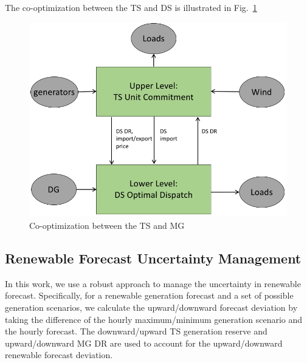 The co-optimization between the TS and DS is illustrated in Fig.~\ref{wees}
\begin{figure}
\centering
\includegraphics[scale=0.3]{flows.png}
\caption{Co-optimization between the TS and MG}
\label{wees}
\end{figure}

\subsection{Renewable Forecast Uncertainty Management}
In this work, we use a robust approach to manage the uncertainty in renewable forecast. Specifically, for a renewable generation forecast and a set of possible generation scenarios, we calculate the upward/downward forecast deviation by taking the difference of the hourly maximum/minimum generation scenario and the hourly forecast. The downward/upward TS generation reserve and upward/downward MG DR are used to account for the upward/downward renewable forecast deviation.

